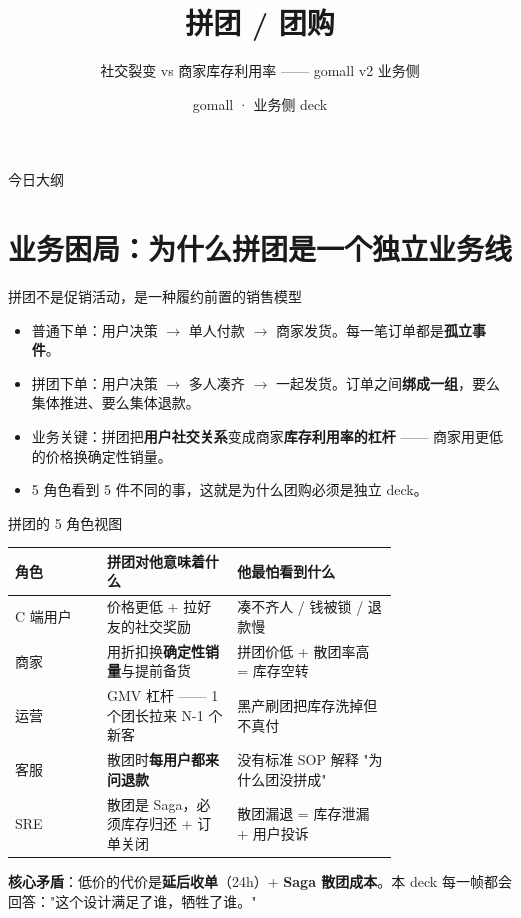 \documentclass[aspectratio=169,11pt]{beamer}
\title{拼团 / 团购}
\subtitle{社交裂变 vs 商家库存利用率 —— gomall v2 业务侧}
\author{gomall · 业务侧 deck}
\date{}
\begin{document}
\maketitle

\begin{frame}[shrink]{今日大纲}
\tableofcontents
\end{frame}

\section{业务困局：为什么拼团是一个独立业务线}

\begin{frame}[shrink]{拼团不是促销活动，是一种履约前置的销售模型}
\begin{itemize}
  \item 普通下单：用户决策 \textbf{$\to$} 单人付款 \textbf{$\to$} 商家发货。每一笔订单都是\textbf{孤立事件}。
  \item 拼团下单：用户决策 \textbf{$\to$} 多人凑齐 \textbf{$\to$} 一起发货。订单之间\textbf{绑成一组}，要么集体推进、要么集体退款。
  \item 业务关键：拼团把\textbf{用户社交关系}变成商家\textbf{库存利用率的杠杆} —— 商家用更低的价格换确定性销量。
  \item 5 角色看到 5 件不同的事，这就是为什么团购必须是独立 deck。
\end{itemize}
\end{frame}

\begin{frame}[shrink]{拼团的 5 角色视图}
\scriptsize
\begin{tabular}{@{}lp{0.34\linewidth}p{0.42\linewidth}@{}}
\toprule
角色 & 拼团对他意味着什么 & 他最怕看到什么 \\
\midrule
C 端用户   & 价格更低 + 拉好友的社交奖励          & 凑不齐人 / 钱被锁 / 退款慢 \\
商家       & 用折扣换\textbf{确定性销量}与提前备货 & 拼团价低 + 散团率高 = 库存空转 \\
运营       & GMV 杠杆 —— 1 个团长拉来 N-1 个新客    & 黑产刷团把库存洗掉但不真付 \\
客服       & 散团时\textbf{每用户都来问退款}       & 没有标准 SOP 解释 "为什么团没拼成" \\
SRE        & 散团是 Saga，必须库存归还 + 订单关闭   & 散团漏退 = 库存泄漏 + 用户投诉 \\
\bottomrule
\end{tabular}
\vspace{2mm}
\small \textbf{核心矛盾}：低价的代价是\textbf{延后收单}（24h）+ \textbf{Saga 散团成本}。本 deck 每一帧都会回答："这个设计满足了谁，牺牲了谁。"
\end{frame}
\end{document}
